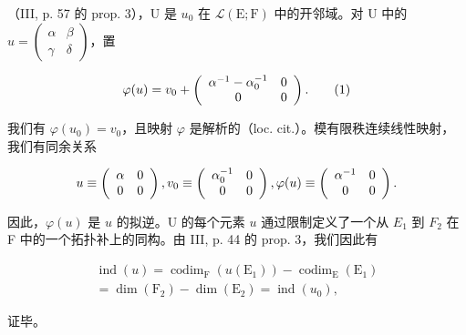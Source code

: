 （III, p. 57 的 prop. 3），U 是 \(u_0\) 在 \(\mathcal{L}(\mathrm{E};\mathrm{F})\) 中的开邻域。对 U 中的 \(u = \begin{pmatrix} \alpha & \beta \\ \gamma & \delta \end{pmatrix}\)，置

\[
\varphi (u) = v _ {0} + \left( \begin{array}{c c} \alpha^ {- 1} - \alpha_ {0} ^ {- 1} & 0 \\ 0 & 0 \end{array} \right).\tag{1}
\]

我们有 \(\varphi(u_{0}) = v_{0}\)，且映射 \(\varphi\) 是解析的（loc. cit.）。模有限秩连续线性映射，我们有同余关系

\[
u \equiv \left( \begin{array}{c c} \alpha & 0 \\ 0 & 0 \end{array} \right) , v _ {0} \equiv \left( \begin{array}{c c} \alpha_ {0} ^ {- 1} & 0 \\ 0 & 0 \end{array} \right) , \varphi (u) \equiv \left( \begin{array}{c c} \alpha^ {- 1} & 0 \\ 0 & 0 \end{array} \right).
\]

因此，\(\varphi(u)\) 是 \(u\) 的拟逆。U 的每个元素 \(u\) 通过限制定义了一个从 \(E _1\) 到 \(F _2\) 在 F 中的一个拓扑补上的同构。由 III, p. 44 的 prop. 3，我们因此有

\[
\begin{array}{c} \operatorname{ind} (u) = \operatorname{codim} _ {\mathrm{F}} (u (\mathrm{E} _ {1})) - \operatorname{codim} _ {\mathrm{E}} (\mathrm{E} _ {1}) \\ = \dim (\mathrm{F} _ {2}) - \dim (\mathrm{E} _ {2}) = \operatorname{ind} (u _ {0}), \end{array}
\]

证毕。
\relax{}
